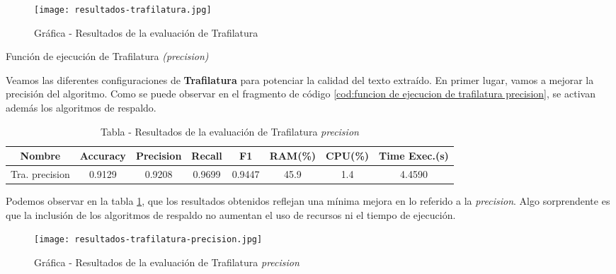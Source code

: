 \begin{figure}[tphb]
    \centering
    \texttt{[image: resultados-trafilatura.jpg]}
    \caption{Gráfica - Resultados de la evaluación de Trafilatura}
    \label{img:grafica - resultados de la evaluacion de trafilatura}
\end{figure}

\begin{codefloat}
    
    \caption{Función de ejecución de Trafilatura \emph{(precision)}}
    \label{cod:funcion de ejecucion de trafilatura precision}
\end{codefloat}

Veamos las diferentes configuraciones de \textbf{Trafilatura} para potenciar la calidad del texto extraído.
En primer lugar, vamos a mejorar la precisión del algoritmo. Como se puede observar en el fragmento de
código \ref{cod:funcion de ejecucion de trafilatura precision}, se activan además los algoritmos de respaldo.

\begin{table}[h]
    \begin{center}
      \begin{tabular}{| c | c | c | c | c | c | c | c |} \hline 
       \textbf{Nombre} & \textbf{Accuracy} & \textbf{Precision}  & \textbf{Recall} & \textbf{F1} & \textbf{RAM(\%)} & \textbf{CPU(\%)} & \textbf{Time Exec.(s)} \\ \hline
       Tra. precision & 0.9129 & 0.9208 & 0.9699 & 0.9447 & 45.9 & 1.4 & 4.4590 \\ \hline
      \end{tabular}
      \caption{Tabla - Resultados de la evaluación de Trafilatura \emph{precision}}
      \label{tab:tabla - resultados de la evaluacion de trafilatura precision}
    \end{center}
\end{table}

Podemos observar en la tabla \ref{tab:tabla - resultados de la evaluacion de trafilatura precision}, que
los resultados obtenidos reflejan una mínima mejora en lo referido a la \emph{precision}. Algo sorprendente
es que la inclusión de los algoritmos de respaldo no aumentan el uso de recursos ni el tiempo de ejecución.

\begin{figure}[tphb]
    \centering
    \texttt{[image: resultados-trafilatura-precision.jpg]}
    \caption{Gráfica - Resultados de la evaluación de Trafilatura \emph{precision}}
    \label{img:grafica - resultados de la evaluacion de trafilatura precision}
\end{figure}

